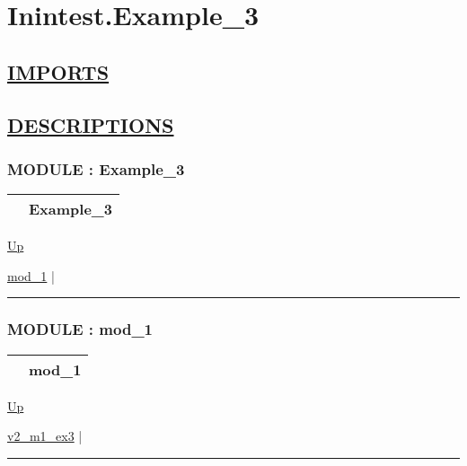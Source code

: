 \chapter*{Inintest.Example\_3}
\hypertarget{ecldoc:toc:Inintest.Example_3}{}

\section*{\underline{IMPORTS}}

\section*{\underline{DESCRIPTIONS}}
\subsection*{MODULE : Example\_3}
\hypertarget{ecldoc:Inintest.Example_3}{}

{\renewcommand{\arraystretch}{1.5}
\begin{tabularx}{\textwidth}{|>{\raggedright\arraybackslash}l|X|}
\hline
\hspace{0pt} & Example\_3 \\
\hline
\end{tabularx}
}

\hyperlink{ecldoc:toc:Inintest}{Up}

\par


\hyperlink{ecldoc:Inintest.Example_3.mod_1}{mod\_1}  |

\rule{\textwidth}{0.4pt}

\subsection*{MODULE : mod\_1}
\hypertarget{ecldoc:Inintest.Example_3.mod_1}{}

{\renewcommand{\arraystretch}{1.5}
\begin{tabularx}{\textwidth}{|>{\raggedright\arraybackslash}l|X|}
\hline
\hspace{0pt} & mod\_1 \\
\hline
\end{tabularx}
}

\hyperlink{ecldoc:Inintest.Example_3}{Up}

\par


\hyperlink{ecldoc:inintest.example_3.mod_1.v2_m1_ex3}{v2\_m1\_ex3}  |

\rule{\textwidth}{0.4pt}


